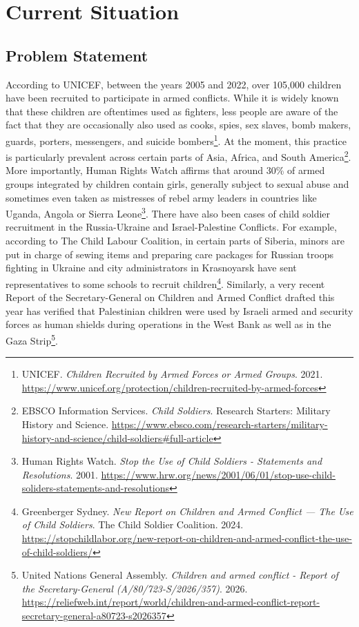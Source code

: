 \section{Current Situation}

\subsection{Problem Statement}

According to UNICEF, between the years 2005 and 2022, over 105,000 children have been recruited to participate in armed conflicts. While it is widely known that these children are oftentimes used as fighters, less people are aware of the fact that they are occasionally also used as cooks, spies, sex slaves, bomb makers, guards, porters, messengers, and suicide bombers\footnote{UNICEF. \emph{Children Recruited by Armed Forces or Armed Groups}. 2021. \url{https://www.unicef.org/protection/children-recruited-by-armed-forces}}. At the moment, this practice is particularly prevalent across certain parts of Asia, Africa, and South America\footnote{EBSCO Information Services. \emph{Child Soldiers}. Research Starters: Military History and Science. \url{https://www.ebsco.com/research-starters/military-history-and-science/child-soldiers\#full-article}}. More importantly, Human Rights Watch affirms that around 30\% of armed groups integrated by children contain girls, generally subject to sexual abuse and sometimes even taken as mistresses of rebel army leaders in countries like Uganda, Angola or Sierra Leone\footnote{Human Rights Watch. \emph{Stop the Use of Child Soldiers - Statements and Resolutions}. 2001. \url{https://www.hrw.org/news/2001/06/01/stop-use-child-soliders-statements-and-resolutions}}. There have also been cases of child soldier recruitment in the Russia-Ukraine and Israel-Palestine Conflicts. For example, according to The Child Labour Coalition, in certain parts of Siberia, minors are put in charge of sewing items and preparing care packages for Russian troops fighting in Ukraine and city administrators in Krasnoyarsk have sent representatives to some schools to recruit children\footnote{Greenberger Sydney. \emph{New Report on Children and Armed Conflict — The Use of Child Soldiers}. The Child Soldier Coalition. 2024. \url{https://stopchildlabor.org/new-report-on-children-and-armed-conflict-the-use-of-child-soldiers/}}. Similarly, a very recent Report of the Secretary-General on Children and Armed Conflict drafted this year has verified that Palestinian children were used by Israeli armed and security forces as human shields during operations in the West Bank as well as in the Gaza Strip\footnote{United Nations General Assembly. \emph{Children and armed conflict - Report of the Secretary-General (A/80/723-S/2026/357)}. 2026. \url{https://reliefweb.int/report/world/children-and-armed-conflict-report-secretary-general-a80723-s2026357}}.

